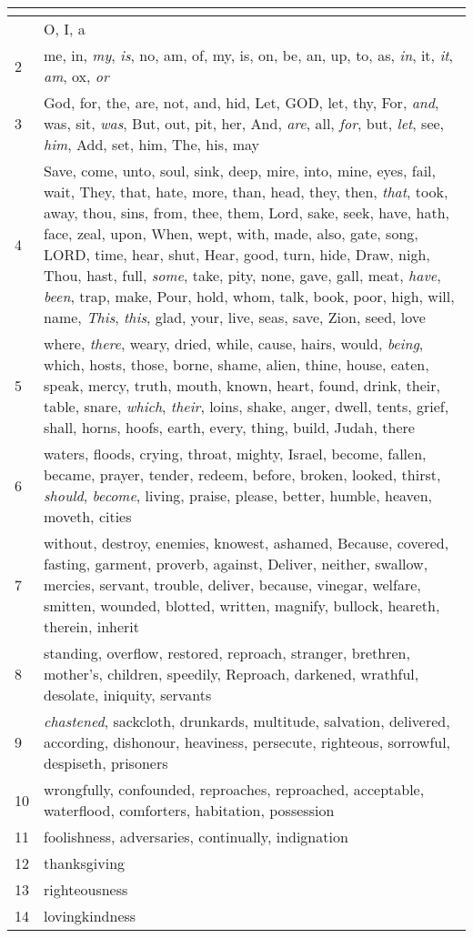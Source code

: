 \begin{center}
\begin{longtable}{l|p{3.75in}}
\hline \multicolumn{2}{c}{{ }} \\ \hline
\endfoot 
1 & O, I, a\\ \hline 
2 & me, in, \emph{my}, \emph{is}, no, am, of, my, is, on, be, an, up, to, as, \emph{in}, it, \emph{it}, \emph{am}, ox, \emph{or}\\ \hline 
3 & God, for, the, are, not, and, hid, Let, GOD, let, thy, For, \emph{and}, was, sit, \emph{was}, But, out, pit, her, And, \emph{are}, all, \emph{for}, but, \emph{let}, see, \emph{him}, Add, set, him, The, his, may\\ \hline 
4 & Save, come, unto, soul, sink, deep, mire, into, mine, eyes, fail, wait, They, that, hate, more, than, head, they, then, \emph{that}, took, away, thou, sins, from, thee, them, Lord, sake, seek, have, hath, face, zeal, upon, When, wept, with, made, also, gate, song, LORD, time, hear, shut, Hear, good, turn, hide, Draw, nigh, Thou, hast, full, \emph{some}, take, pity, none, gave, gall, meat, \emph{have}, \emph{been}, trap, make, Pour, hold, whom, talk, book, poor, high, will, name, \emph{This}, \emph{this}, glad, your, live, seas, save, Zion, seed, love\\ \hline 
5 & where, \emph{there}, weary, dried, while, cause, hairs, would, \emph{being}, which, hosts, those, borne, shame, alien, thine, house, eaten, speak, mercy, truth, mouth, known, heart, found, drink, their, table, snare, \emph{which}, \emph{their}, loins, shake, anger, dwell, tents, grief, shall, horns, hoofs, earth, every, thing, build, Judah, there\\ \hline 
6 & waters, floods, crying, throat, mighty, Israel, become, fallen, became, prayer, tender, redeem, before, broken, looked, thirst, \emph{should}, \emph{become}, living, praise, please, better, humble, heaven, moveth, cities\\ \hline 
7 & without, destroy, enemies, knowest, ashamed, Because, covered, fasting, garment, proverb, against, Deliver, neither, swallow, mercies, servant, trouble, deliver, because, vinegar, welfare, smitten, wounded, blotted, written, magnify, bullock, heareth, therein, inherit\\ \hline 
8 & standing, overflow, restored, reproach, stranger, brethren, mother's, children, speedily, Reproach, darkened, wrathful, desolate, iniquity, servants\\ \hline 
9 & \emph{chastened}, sackcloth, drunkards, multitude, salvation, delivered, according, dishonour, heaviness, persecute, righteous, sorrowful, despiseth, prisoners\\ \hline 
10 & wrongfully, confounded, reproaches, reproached, acceptable, waterflood, comforters, habitation, possession\\ \hline 
11 & foolishness, adversaries, continually, indignation\\ \hline 
12 & thanksgiving\\ \hline 
13 & righteousness\\ \hline 
14 & lovingkindness\\ \hline 
\end{longtable}
\end{center}





